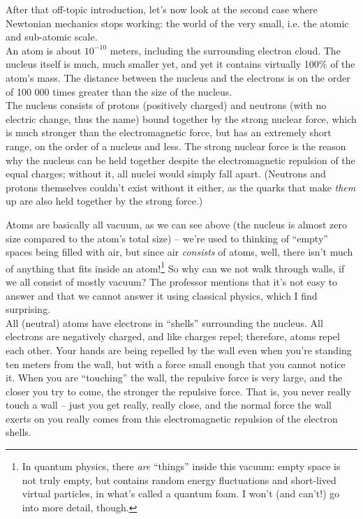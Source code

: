 \documentclass[8.01x]{subfiles}
\begin{document}
After that off-topic introduction, let's now look at the second case where Newtonian mechanics stops working: the world of the very small, i.e. the atomic and sub-atomic scale.\\
An atom is about $10^{-10}$ meters, including the surrounding electron cloud. The nucleus itself is much, much smaller yet, and yet it contains virtually 100\% of the atom's mass. The distance between the nucleus and the electrons is on the order of 100 000 times greater than the size of the nucleus.\\
The nucleus consists of protons (positively charged) and neutrons (with no electric change, thus the name) bound together by the strong nuclear force, which is much stronger than the electromagnetic force, but has an extremely short range, on the order of a nucleus and less. The strong nuclear force is the reason why the nucleus can be held together despite the electromagnetic repulsion of the equal charges; without it, all nuclei would simply fall apart. (Neutrons and protons themselves couldn't exist without it either, as the quarks that make \emph{them} up are also held together by the strong force.)

Atoms are basically all vacuum, as we can see above (the nucleus is almost zero size compared to the atom's total size) -- we're used to thinking of ``empty'' spaces being filled with air, but since air \emph{consists} of atoms, well, there isn't much of anything that fits inside an atom!\footnote{In quantum physics, there \emph{are} ``things'' inside this vacuum: empty space is not truly empty, but contains random energy fluctuations and short-lived virtual particles, in what's called a quantum foam. I won't (and can't!) go into more detail, though.}
So why can we not walk through walls, if we all consist of mostly vacuum? The professor mentions that it's not easy to answer and that we cannot answer it using classical physics, which I find surprising.\\
All (neutral) atoms have electrons in ``shells'' surrounding the nucleus. All electrons are negatively charged, and like charges repel; therefore, atoms repel each other. Your hands are being repelled by the wall even when you're standing ten meters from the wall, but with a force small enough that you cannot notice it. When you are ``touching'' the wall, the repulsive force is very large, and the closer you try to come, the stronger the repulsive force. That is, you never really touch a wall -- just you get really, really close, and the normal force the wall exerts on you really comes from this electromagnetic repulsion of the electron shells.
\end{document}
